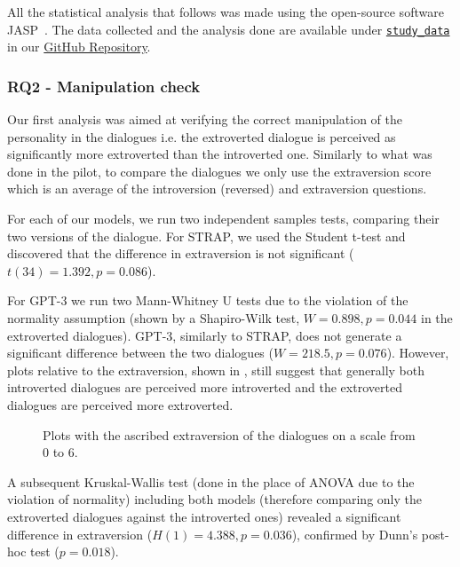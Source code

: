 \documentclass[nomenclature, english, biblatex]{kththesis}
\begin{document}
All the statistical analysis that follows was made using the open-source software JASP~\cite{JASP2022}. The data collected and the analysis done are available under \href{https://github.com/alessioGalatolo/Furhat-Personality-and-Emotions/tree/main/study_data}{\texttt{study_data}} in our \href{https://github.com/alessioGalatolo/Furhat-Personality-and-Emotions/}{GitHub Repository}.
\subsubsection{RQ2 - Manipulation check}
Our first analysis was aimed at verifying the correct manipulation of the personality in the dialogues i.e. the extroverted dialogue is perceived as significantly more extroverted than the introverted one. Similarly to what was done in the pilot, to compare the dialogues we only use the extraversion score which is an average of the introversion (reversed) and extraversion questions.

For each of our models, we run two independent samples tests, comparing their two versions of the dialogue. For STRAP, we used the Student t-test and discovered that the difference in extraversion is not significant ($t(34)=1.392, p=0.086$).

For GPT-3 we run two Mann-Whitney U tests due to the violation of the normality assumption (shown by a Shapiro-Wilk test, $W=0.898, p=0.044$ in the extroverted dialogues). GPT-3, similarly to STRAP, does not generate a significant difference between the two dialogues ($W=218.5, p=0.076$). However, plots relative to the extraversion, shown in , still suggest that generally both introverted dialogues are perceived more introverted and the extroverted dialogues are perceived more extroverted.

\begin{figure}[ht]
    \centering
    \begin{adjustbox}{max width=\textwidth}
         
    \end{adjustbox}
    \caption{Plots with the ascribed extraversion of the dialogues on a scale from 0 to 6.}
    \label{fig:study_personality}
\end{figure}

A subsequent Kruskal-Wallis test (done in the place of \gls{ANOVA} due to the violation of normality) including both models (therefore comparing only the extroverted dialogues against the introverted ones) revealed a significant difference in extraversion ($H(1) = 4.388, p=0.036$), confirmed by Dunn's post-hoc test ($p=0.018$).
\end{document}
